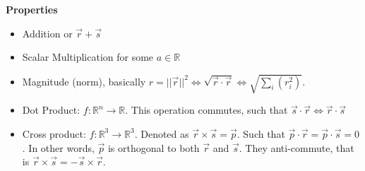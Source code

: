 \documentclass{article}
\newtheorem{one minute paper}[theorem]{One Minute Paper}
\begin{document}
\textbf{Properties}
\begin{itemize}
    \item Addition or $\vec{r} + \vec{s}$
    \item Scalar Multiplication for some $a \in \mathbb{R}$
    \item Magnitude (norm), basically $r = ||\vec{r}||^2 \iff \sqrt{\vec{r} \cdot \vec{r}} \iff \sqrt{\sum_i(r_i^2)}$.
    \item Dot Product: $f : \mathbb{R}^n \rightarrow \mathbb{R}$. This operation commutes, such that $\vec{s} \cdot \vec{r} \iff \vec{r} \cdot \vec{s}$
    \item Cross product: $f : \mathbb{R}^3 \rightarrow \mathbb{R}^3$. Denoted as $\vec{r} \times \vec{s} = \vec{p}$. Such that $\vec{p} \cdot \vec{r} = \vec{p} \cdot \vec{s} = 0$. In other words, $\vec{p}$ is orthogonal to both $\vec{r}$ and $\vec{s}$. They anti-commute, that is $\vec{r} \times \vec{s} = -\vec{s} \times \vec{r}$. 
\end{itemize}
\end{document}
